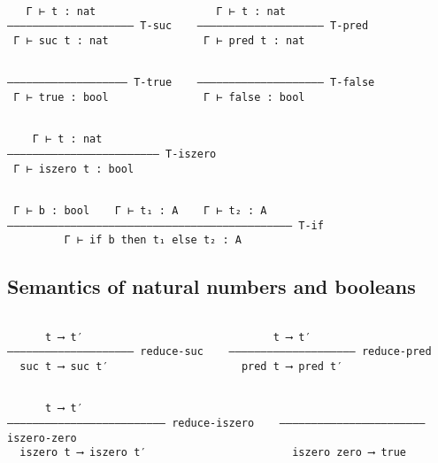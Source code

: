 \documentclass[11pt]{article}
\theoremstyle{definition}
\begin{document}
\begin{verbatim}

   Γ ⊢ t : nat                   Γ ⊢ t : nat                 
–––––––––––––––––––– T-suc    –––––––––––––––––––– T-pred                                 
 Γ ⊢ suc t : nat               Γ ⊢ pred t : nat                                           

\end{verbatim}

\begin{verbatim}

––––––––––––––––––– T-true    –––––––––––––––––––– T-false
 Γ ⊢ true : bool               Γ ⊢ false : bool

\end{verbatim}

\begin{verbatim}

    Γ ⊢ t : nat
–––––––––––––––––––––––– T-iszero
 Γ ⊢ iszero t : bool 

\end{verbatim}

\begin{verbatim}

 Γ ⊢ b : bool    Γ ⊢ t₁ : A    Γ ⊢ t₂ : A
––––––––––––––––––––––––––––––––––––––––––––– T-if
         Γ ⊢ if b then t₁ else t₂ : A

\end{verbatim}

\subsection{Semantics of natural numbers and booleans}
\label{sec:orgd6223d0}

\begin{verbatim}

      t ⟶ t′                              t ⟶ t′                 
–––––––––––––––––––– reduce-suc    –––––––––––––––––––– reduce-pred                                 
  suc t ⟶ suc t′                     pred t ⟶ pred t′                                           

\end{verbatim}

\begin{verbatim}

      t ⟶ t′                                              
––––––––––––––––––––––––– reduce-iszero    ––––––––––––––––––––––– iszero-zero
  iszero t ⟶ iszero t′                       iszero zero ⟶ true                                           

\end{verbatim}
\end{document}
